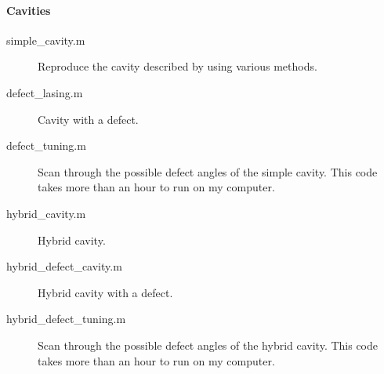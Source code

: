 \paragraph{Cavities}

\begin{description}
	\item[simple\_cavity.m] Reproduce the cavity described by \textcite{topf_modes_2014} using various methods.
	\item[defect\_lasing.m] Cavity with a defect.
	\item[defect\_tuning.m] Scan through the possible defect angles of the simple cavity. This code takes more than an hour to run on my computer.
	\item[hybrid\_cavity.m] Hybrid cavity.
	\item[hybrid\_defect\_cavity.m] Hybrid cavity with a defect.
	\item[hybrid\_defect\_tuning.m] Scan through the possible defect angles of the hybrid cavity. This code takes more than an hour to run on my computer.
\end{description}